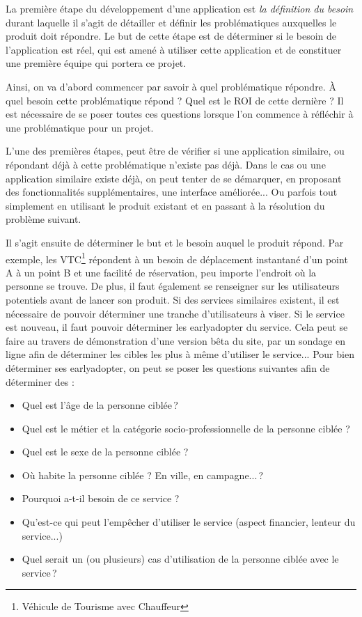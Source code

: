 La première étape du développement d'une application est \emph{la définition du besoin} durant laquelle il s'agit de détailler et définir les problématiques auxquelles le produit doit répondre. Le but de cette étape est de déterminer si le besoin de l'application est réel, qui est amené à utiliser cette application et de constituer une première équipe qui portera ce projet.

Ainsi, on va d'abord commencer par savoir à quel problématique répondre. À quel besoin cette problématique répond ? Quel est le \gls{ROI} de cette dernière ? Il est nécessaire de se poser toutes ces questions lorsque l'on commence à réfléchir à une problématique pour un projet.

L'une des premières étapes, peut être de vérifier si une application similaire, ou répondant déjà à cette problématique n'existe pas déjà. Dans le cas ou une application similaire existe déjà, on peut tenter de se démarquer, en proposant des fonctionnalités supplémentaires, une interface améliorée... Ou parfois tout simplement en utilisant le produit existant et en passant à la résolution du problème suivant.

Il s'agit ensuite de déterminer le but et le besoin auquel le produit répond. Par exemple, les VTC\footnote{Véhicule de Tourisme avec Chauffeur} répondent à un besoin de déplacement instantané d'un point A à un point B et une facilité de réservation, peu importe l'endroit où la personne se trouve. De plus, il faut également se renseigner sur les utilisateurs potentiels avant de lancer son produit. Si des services similaires existent, il est nécessaire de pouvoir déterminer une tranche d'utilisateurs à viser. Si le service est nouveau, il faut pouvoir déterminer les \gls{earlyadopter} du service. Cela peut se faire au travers de démonstration d'une version bêta du site, par un sondage en ligne afin de déterminer les cibles les plus à même d'utiliser le service... Pour bien déterminer ses \gls{earlyadopter}, on peut se poser les questions suivantes afin de déterminer des  :

\begin{itemize}
	\setlength\itemsep{-0.5em}
	\item Quel est l'âge de la personne ciblée ?
	\item Quel est le métier et la catégorie socio-professionnelle de la personne ciblée ?
	\item Quel est le sexe de la personne ciblée ? 
	\item Où habite la personne ciblée ? En ville, en campagne... ? 
	\item Pourquoi a-t-il besoin de ce service ? 
	\item Qu'est-ce qui peut l'empêcher d'utiliser le service (aspect financier, lenteur du service...) 
	\item Quel serait un (ou plusieurs) cas d'utilisation de la personne ciblée avec le service ?
\end{itemize}

